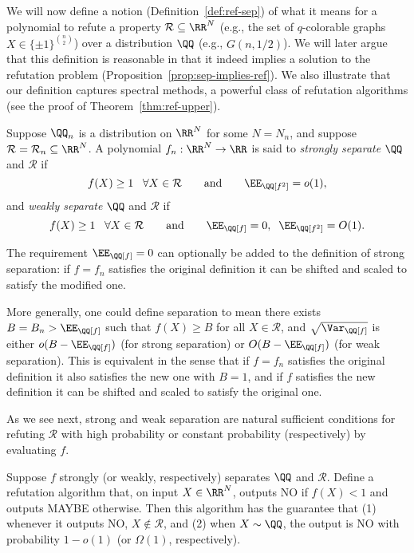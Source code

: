 \documentclass{article}
\begin{document}
We will now define a notion (Definition~\ref{def:ref-sep}) of what it means for a polynomial to refute a property $\mathcal{R} \subseteq \RR^N$ (e.g., the set of $q$-colorable graphs $X \in \{\pm 1\}^{\binom{n}{2}}$) over a distribution $\QQ$ (e.g., $G(n,1/2)$). We will later argue that this definition is reasonable in that it indeed implies a solution to the refutation problem (Proposition~\ref{prop:sep-implies-ref}). We also illustrate that our definition captures spectral methods, a powerful class of refutation algorithms (see the proof of Theorem~\ref{thm:ref-upper}).

\begin{definition}
\label{def:ref-sep}
Suppose $\QQ_n$ is a distribution on $\RR^N$ for some $N = N_n$, and suppose $\mathcal{R} = \mathcal{R}_n \subseteq \RR^N$. A polynomial $f_n: \RR^N \to \RR$ is said to \emph{strongly separate} $\QQ$ and $\mathcal{R}$ if
\[ f(X) \ge 1 \;\;\; \forall X \in \mathcal{R} \qquad\text{and}\qquad \EE_\QQ[f^2] = o(1), \]
and \emph{weakly separate} $\QQ$ and $\mathcal{R}$ if
\[ f(X) \ge 1 \;\;\; \forall X \in \mathcal{R} \qquad\text{and}\qquad \EE_\QQ[f] = 0, \;\; \EE_\QQ[f^2] = O(1). \]
\end{definition}


\begin{remark}
The requirement $\EE_\QQ[f] = 0$ can optionally be added to the definition of strong separation: if $f = f_n$ satisfies the original definition it can be shifted and scaled to satisfy the modified one.

More generally, one could define separation to mean there exists $B = B_n > \EE_\QQ[f]$ such that $f(X) \ge B$ for all $X \in \mathcal{R}$, and $\sqrt{\Var_\QQ[f]}$ is either $o(B - \EE_\QQ[f])$ (for strong separation) or $O(B - \EE_\QQ[f])$ (for weak separation). This is equivalent in the sense that if $f = f_n$ satisfies the original definition it also satisfies the new one with $B=1$, and if $f$ satisfies the new definition it can be shifted and scaled to satisfy the original one.
\end{remark}

As we see next, strong and weak separation are natural sufficient conditions for refuting $\mathcal{R}$ with high probability or constant probability (respectively) by evaluating $f$.

\begin{proposition}
\label{prop:sep-implies-ref}
Suppose $f$ strongly (or weakly, respectively) separates $\QQ$ and $\mathcal{R}$. Define a refutation algorithm that, on input $X \in \RR^N$, outputs NO if $f(X) < 1$ and outputs MAYBE otherwise. Then this algorithm has the guarantee that (1) whenever it outputs NO, $X \notin \mathcal{R}$, and (2) when $X \sim \QQ$, the output is NO with probability $1-o(1)$ (or $\Omega(1)$, respectively).
\end{proposition}
\end{document}

